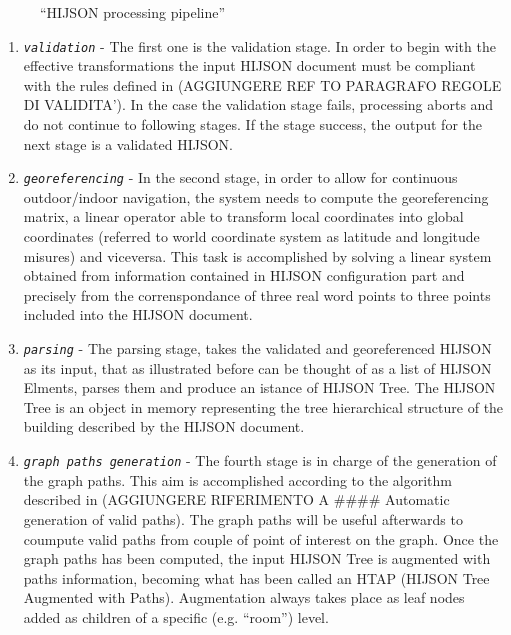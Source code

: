 \begin{figure}[!htbp]
\centering
{}
\caption{``HIJSON processing pipeline''}
\label{fig:pipeline}
\end{figure}

\begin{enumerate}
\def\labelenumi{\arabic{enumi}.}
\itemsep1pt\parskip0pt
\item
 \textit{\texttt{validation}} - The first one is the validation stage. In
 order to begin with the effective transformations the input HIJSON
 document must be compliant with the rules defined in (AGGIUNGERE REF
 TO PARAGRAFO REGOLE DI VALIDITA'). In the case the validation stage
 fails, processing aborts and do not continue to following stages. If
 the stage success, the output for the next stage is a validated
 HIJSON.
\item
 \textit{\texttt{georeferencing}} - In the second stage, in order to allow
 for continuous outdoor/indoor navigation, the system needs to compute
 the georeferencing matrix, a linear operator able to transform local
 coordinates into global coordinates (referred to world coordinate
 system as latitude and longitude misures) and viceversa. This task is
 accomplished by solving a linear system obtained from information
 contained in HIJSON configuration part and precisely from the
 correnspondance of three real word points to three points included
 into the HIJSON document.
\item
 \textit{\texttt{parsing}} - The parsing stage, takes the validated and
 georeferenced HIJSON as its input, that as illustrated before can be
 thought of as a list of HIJSON Elments, parses them and produce an
 istance of HIJSON Tree. The HIJSON Tree is an object in memory
 representing the tree hierarchical structure of the building described
 by the HIJSON document.
\item
 \textit{\texttt{graph paths generation}} - The fourth stage is in charge
 of the generation of the graph paths. This aim is accomplished
 according to the algorithm described in (AGGIUNGERE RIFERIMENTO A
 \#\#\#\# Automatic generation of valid paths). The graph paths will be
 useful afterwards to coumpute valid paths from couple of point of
 interest on the graph. Once the graph paths has been computed, the
 input HIJSON Tree is augmented with paths information, becoming what
 has been called an HTAP (HIJSON Tree Augmented with Paths).
 Augmentation always takes place as leaf nodes added as children of a
 specific (e.g. ``room'') level.

\end{enumerate}
